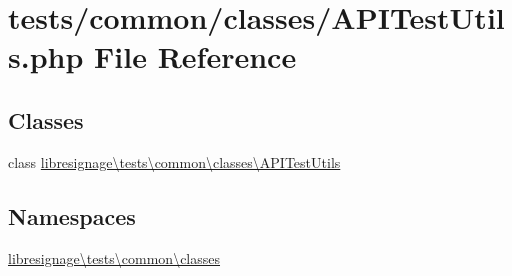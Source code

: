 \hypertarget{APITestUtils_8php}{}\section{tests/common/classes/\+A\+P\+I\+Test\+Utils.php File Reference}
\label{APITestUtils_8php}
\subsection*{Classes}
\begin{DoxyCompactItemize}
\item 
class \hyperlink{classlibresignage_1_1tests_1_1common_1_1classes_1_1APITestUtils}{libresignage\textbackslash{}tests\textbackslash{}common\textbackslash{}classes\textbackslash{}\+A\+P\+I\+Test\+Utils}
\end{DoxyCompactItemize}
\subsection*{Namespaces}
\begin{DoxyCompactItemize}
\item 
 \hyperlink{namespacelibresignage_1_1tests_1_1common_1_1classes}{libresignage\textbackslash{}tests\textbackslash{}common\textbackslash{}classes}
\end{DoxyCompactItemize}
